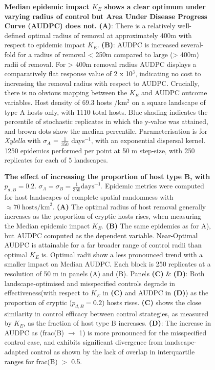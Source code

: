 \documentclass[11pt,letterpaper]{article}
\begin{document}
\begin{figure}[h]
	\centering
	\vspace{10mm}
	\caption { \label{1d} \textbf{Median epidemic impact $K_E$ shows a clear optimum under varying radius of control but Area Under Disease Progress Curve (AUDPC) does not.} \textbf{(A)}: There is a relatively well-defined optimal radius of removal at approximately 400m with respect to epidemic impact $K_E$.   \textbf{(B)}: AUDPC is increased several-fold for a radius of removal < 250m compared to large (> 400m) radii of removal. For > 400m removal radius AUDPC displays a comparatively flat response value of 2 x 10$^{3}$, indicating no cost to increasing the removal radius with respect to AUDPC. Crucially, there is no obvious mapping between the $K_E$ and AUDPC outcome variables. Host density of 69.3 hosts /km$^{2}$ on a square landscape of type A hosts only, with 1110 total hosts. Blue shading indicates the percentile of stochastic replicates in which the y-value was attained, and brown dots show the median percentile. Parameterisation is for \emph{Xylella} with $\sigma_{A}$ = $\frac{1}{350}$ days$^{-1}$, with an exponential dispersal kernel. 1250 epidemics performed per point at 50 m step-size, with 250 replicates for each of 5 landscapes.}
	\vspace{10mm}
\end{figure}

\begin{figure}%
	\centering
	
			\vspace{5mm}
	\caption{ \label{complex1} 
			\textbf{The effect of increasing the proportion of host type B, with $p_{d,B}  = 0.2$}. $\sigma_{A} = \sigma_{B} = \frac{1}{350}  \mathrm{days}^{-1}$. Epidemic metrics were computed for host landscapes of complete spatial randomness with $\approx 70 \: \mathrm{ hosts} / \mathrm{km}^2$. \textbf{(A)} The optimal radius of host removal generally increases as the proportion of cryptic hosts rises, when measuring the Median epidemic impact $K_E$. \textbf{(B)} The same epidemics as for A), but AUDPC computed as the dependent variable. Near-Optimal AUDPC is attainable for a far broader range of control radii than optimal $K_E$ is. Optimal radii show a less pronounced trend with a smaller impact on Median AUDPC. Each block is 250 replicates at a resolution of 50 m in panels (A) and (B). Panels \textbf{(C)} \& \textbf{(D)}: Both landscape-optimised and misspecified controls degrade in effectiveness(with respect to $K_{E}$ in \textbf{(C)} and AUDPC in \textbf{(D)})  as the proportion of cryptic ($p_{d,B} = 0.2$) hosts rises. \textbf{(C)} shows the close similarity in control efficacy between control strategies, as measured by $K_E$, as the fraction of host type B increases. \textbf{(D)}: The increase in AUDPC as (frac(B) $\rightarrow$ 1) is more pronounced for the misspecified control case, and exhibits significant divergence from landscape-adapted control as shown by the lack of overlap in interquartile ranges for frac(B) $>$ 0.5. }
\end{figure}
\end{document}
